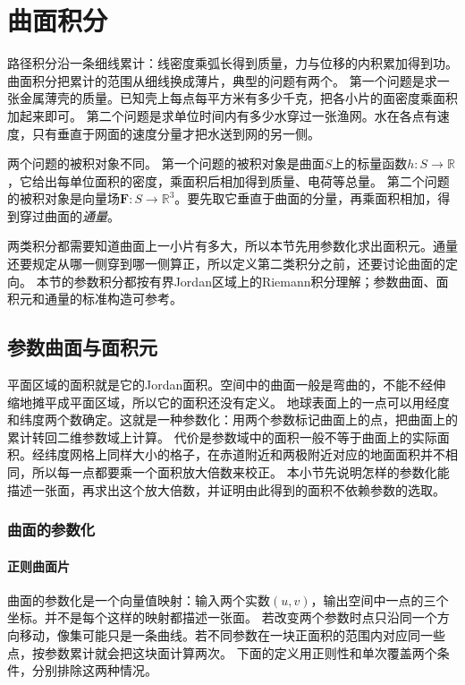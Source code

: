 \par{}
\section{曲面积分}
\label{sec:analysis-surface-integration}

路径积分沿一条细线累计：线密度乘弧长得到质量，力与位移的内积累加得到功。
曲面积分把累计的范围从细线换成薄片，典型的问题有两个。
第一个问题是求一张金属薄壳的质量。已知壳上每点每平方米有多少千克，把各小片的面密度乘面积加起来即可。
第二个问题是求单位时间内有多少水穿过一张渔网。水在各点有速度，只有垂直于网面的速度分量才把水送到网的另一侧。

两个问题的被积对象不同。
第一个问题的被积对象是曲面$S$上的标量函数$h:S\to\mathbb R$，它给出每单位面积的密度，乘面积后相加得到质量、电荷等总量。
第二个问题的被积对象是向量场$\bm F:S\to\mathbb R^3$。要先取它垂直于曲面的分量，再乘面积相加，得到穿过曲面的\emph{通量}。

两类积分都需要知道曲面上一小片有多大，所以本节先用参数化求出面积元。通量还要规定从哪一侧穿到哪一侧算正，所以定义第二类积分之前，还要讨论曲面的定向。
本节的参数积分都按有界Jordan区域上的Riemann积分理解；参数曲面、面积元和通量的标准构造可参考。

\subsection{参数曲面与面积元}

平面区域的面积就是它的Jordan面积。空间中的曲面一般是弯曲的，不能不经伸缩地摊平成平面区域，所以它的面积还没有定义。
地球表面上的一点可以用经度和纬度两个数确定。这就是一种参数化：用两个参数标记曲面上的点，把曲面上的累计转回二维参数域上计算。
代价是参数域中的面积一般不等于曲面上的实际面积。经纬度网格上同样大小的格子，在赤道附近和两极附近对应的地面面积并不相同，所以每一点都要乘一个面积放大倍数来校正。
本小节先说明怎样的参数化能描述一张面，再求出这个放大倍数，并证明由此得到的面积不依赖参数的选取。

\subsubsection{曲面的参数化}

\paragraph{正则曲面片}

曲面的参数化是一个向量值映射：输入两个实数$(u,v)$，输出空间中一点的三个坐标。并不是每个这样的映射都描述一张面。
若改变两个参数时点只沿同一个方向移动，像集可能只是一条曲线。若不同参数在一块正面积的范围内对应同一些点，按参数累计就会把这块面计算两次。
下面的定义用正则性和单次覆盖两个条件，分别排除这两种情况。

